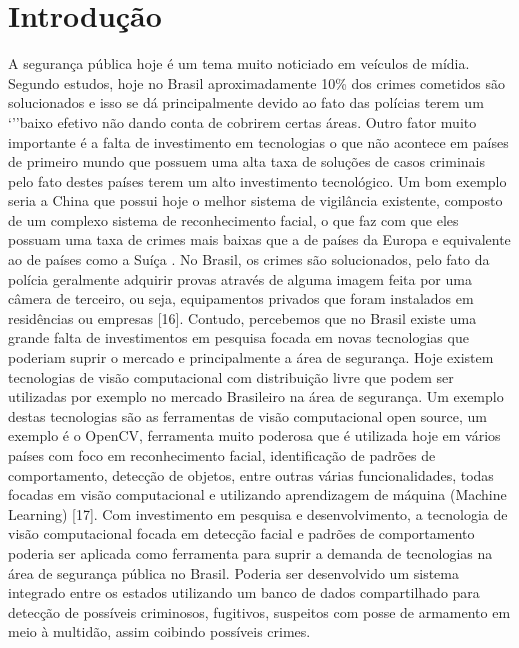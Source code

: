 
\chapter*[Introdução]{Introdução}

A segurança pública hoje é um tema muito noticiado em veículos de mídia. Segundo estudos, hoje no Brasil aproximadamente 10\% dos crimes cometidos são solucionados \cite{um} e isso se dá principalmente devido ao fato das polícias terem um ‘’’baixo efetivo não dando conta de cobrirem certas áreas. Outro fator muito importante é a falta de investimento em tecnologias o que não acontece em países de primeiro mundo que possuem uma alta taxa de soluções de casos criminais pelo fato destes países terem um alto investimento tecnológico. Um bom exemplo seria a China que possui hoje o melhor sistema de vigilância existente, composto de um complexo sistema de reconhecimento facial, o que faz com que eles possuam uma taxa de crimes mais baixas que a de países da Europa e equivalente ao de países como a Suíça \cite{dois}.  
No Brasil, os crimes são solucionados, pelo fato da polícia geralmente adquirir provas através de alguma imagem feita por uma câmera de terceiro, ou seja, equipamentos privados que foram instalados em residências ou empresas [16]. Contudo, percebemos que no Brasil existe uma grande falta de investimentos em pesquisa focada em novas tecnologias que poderiam suprir o mercado e principalmente a área de segurança. 
Hoje existem tecnologias de visão computacional com distribuição livre que podem ser utilizadas por exemplo no mercado Brasileiro na área de segurança. Um exemplo destas tecnologias são as ferramentas de visão computacional open source, um exemplo é o OpenCV, ferramenta muito poderosa que é utilizada hoje em vários países com foco em reconhecimento facial, identificação de padrões de comportamento, detecção de objetos, entre outras várias funcionalidades, todas focadas em visão computacional e utilizando aprendizagem de máquina (Machine Learning) [17].  
Com investimento em pesquisa e desenvolvimento, a tecnologia de visão computacional focada em detecção facial e padrões de comportamento poderia ser aplicada como ferramenta para suprir a demanda de tecnologias na área de segurança pública no Brasil. Poderia ser desenvolvido um sistema integrado entre os estados utilizando um banco de dados compartilhado para detecção de possíveis criminosos, fugitivos, suspeitos com posse de armamento em meio à multidão, assim coibindo possíveis crimes. 
